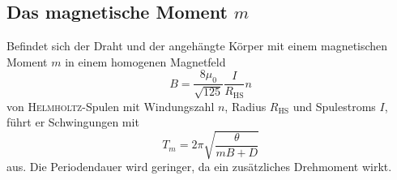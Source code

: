 \subsection{Das magnetische Moment \texorpdfstring{$m$}{m}}

Befindet sich der Draht und der angehängte Körper mit einem magnetischen Moment $m$ in einem homogenen Magnetfeld 
\begin{equation}
B=\frac{8\mu_0}{\sqrt{125}} \frac{I}{R_\mathup{HS}}n
\label{eq:B_HS}
\end{equation}
von \textsc{Helmholtz}-Spulen mit Windungszahl $n$, Radius $R_\mathup{HS}$ und  Spulestroms $I$, führt er Schwingungen mit 
\begin{equation}
T_m=2\pi\sqrt{\frac{\theta}{mB+D}}
\label{eq:t_hs}
\end{equation}
aus. Die Periodendauer wird geringer, da ein zusätzliches Drehmoment wirkt.


